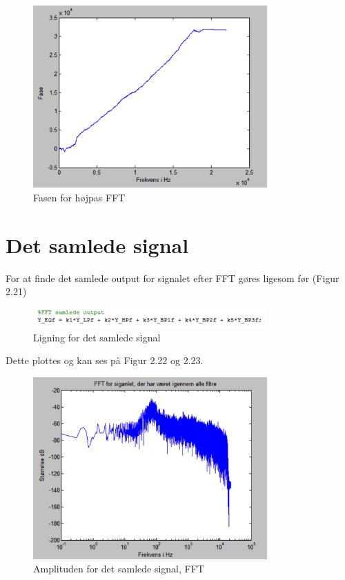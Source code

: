 \begin{figure}[H]
	\centering
	\includegraphics[width=0.8\textwidth]{Figur/Snip20151111_83}
	\caption{Fasen for højpas FFT}
\end{figure}

\section{Det samlede signal}
For at finde det samlede output for signalet efter FFT gøres ligesom før (Figur 2.21)

\begin{figure}[H]
	\centering
	\includegraphics[width=0.8\textwidth]{Figur/Snip20151111_86}
	\caption{Ligning for det samlede signal}
\end{figure}

Dette plottes og kan ses på Figur 2.22 og 2.23. 

\begin{figure}[H]
	\centering
	\includegraphics[width=0.8\textwidth]{Figur/Snip20151111_84}
	\caption{Amplituden for det samlede signal, FFT}
\end{figure}

